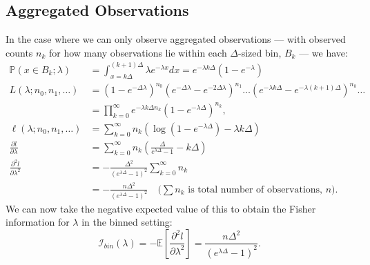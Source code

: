 \documentclass[11pt,a4,twosided,singlespacing,titlepagenumber=on,numbers=endperiod]{scrreprt}
\numberwithin{equation}{chapter} %
\theoremstyle{remark}
\begin{document}
\subsection{Aggregated Observations}
In the case where we can only observe aggregated observations --- with observed counts $n_k$ for how many observations lie within each $\Delta$-sized bin, $B_k$ --- we have:
\begin{equation*}
	\begin{aligned}
		\mathbb{P}(x \in B_k; \lambda) &= \int_{x=k\Delta}^{(k+1)\Delta}{\lambda e^{- \lambda x} dx} = e^{- \lambda k\Delta}(1 - e^{- \lambda}) \\
		L(\lambda ; n_0, n_1, \dots) &= (1-e^{- \Delta\lambda})^{n_0}(e^{- \Delta\lambda} - e^{- 2\Delta\lambda})^{n_1} \dots (e^{- \lambda k\Delta} - e^{-\lambda (k+1)\Delta})^{n_k} \dots \\
		&= \prod_{k=0}^{\infty}{e^{- \lambda k \Delta n_k}(1 - e^{- \lambda \Delta})^{n_k}}, \\
		\ell(\lambda; n_0, n_1, \dots) &= \sum_{k=0}^\infty n_k \left(\log(1 - e^{- \lambda \Delta}) - \lambda k \Delta \right) \\
		\frac{\partial l}{\partial \lambda} &= \sum_{k=0}^\infty n_k \left(\frac{\Delta}{e^{\lambda \Delta} - 1} - k \Delta \right)\\
		\frac{\partial^2 l}{\partial \lambda^2} &= - \frac{\Delta^2}{(e^{\lambda \Delta} - 1)^2} \sum_{k=0}^\infty {n_k} \\
		&= - \frac{n\Delta^2}{(e^{\lambda \Delta} - 1)^2} \quad \text{($\sum n_k$ is total number of observations, $n$)}.
	\end{aligned}
\end{equation*}
We can now take the negative expected value of this to obtain the Fisher information for $\lambda$ in the binned setting:
\begin{equation}\label{eq:exp_fisher}
	\mathcal{I}_{bin}(\lambda) = - \mathbb{E}\left[ \frac{\partial^2 l}{\partial \lambda^2} \right] = \frac{n\Delta^2}{(e^{\lambda \Delta} - 1)^2}.
\end{equation}
\newpage
\end{document}
